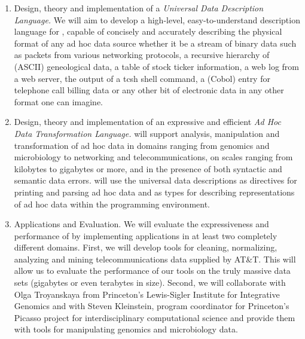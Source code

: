 \begin{enumerate}
\item Design, theory and implementation of a 
{\em Universal Data Description Language.}  
We will aim to develop a 
high-level, easy-to-understand description language for \datatype, capable of
concisely and accurately describing the physical format of
any ad hoc data source whether it be a stream of binary data such as 
packets from various networking protocols, a recursive hierarchy
of (ASCII) geneological data, a table of stock ticker information, a
web log from a web server, the output of a tcsh shell command, a (Cobol) 
entry for telephone call billing data or any other bit of electronic data
in any other format one can imagine.
 
\item Design, theory and implementation of an expressive and efficient 
{\em Ad Hoc Data Transformation Language.}
\datatype{} will support analysis, manipulation and transformation
of ad hoc data in domains ranging from genomics and microbiology to
networking and telecommunications, on scales ranging from kilobytes to 
gigabytes or more, and in the presence of both syntactic and semantic
data errors.  
\datatype{} will use the universal data descriptions as directives for
printing and parsing ad hoc data and as types for describing
representations of ad hoc data within the programming environment.  

\item Applications and Evaluation.  We will evaluate the expressiveness and 
performance of \datatype{}
by implementing applications in at least two completely 
different domains.  First, we will
develop tools for cleaning, normalizing, analyzing and mining
telecommunications data supplied by AT\&T.  This will allow
us to evaluate the performance of our tools on the truly
massive data sets (gigabytes or even terabytes in size).  
Second, we will collaborate with
Olga Troyanskaya from Princeton's Lewis-Sigler Institute for 
Integrative Genomics and with Steven Kleinstein, program coordinator
for Princeton's
Picasso project for interdisciplinary computational science
and provide them with tools for manipulating
genomics and microbiology data.
\end{enumerate}

